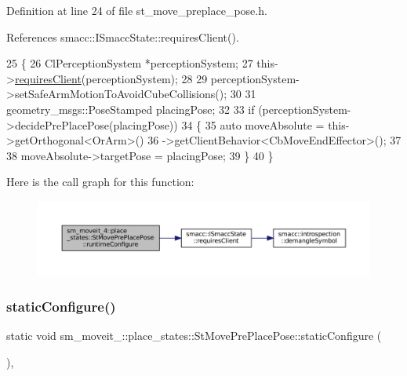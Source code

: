 Definition at line 24 of file st\+\_\+move\+\_\+preplace\+\_\+pose.\+h.



References smacc\+::\+I\+Smacc\+State\+::requires\+Client().


\begin{DoxyCode}
25             \{
26                 ClPerceptionSystem *perceptionSystem;
27                 this->\hyperlink{classsmacc_1_1ISmaccState_a7f95c9f0a6ea2d6f18d1aec0519de4ac}{requiresClient}(perceptionSystem);
28 
29                 perceptionSystem->setSafeArmMotionToAvoidCubeCollisions();
30 
31                 geometry\_msgs::PoseStamped placingPose;
32 
33                 \textcolor{keywordflow}{if} (perceptionSystem->decidePrePlacePose(placingPose))
34                 \{
35                     \textcolor{keyword}{auto} moveAbsolute = this->getOrthogonal<OrArm>()
36                                             ->getClientBehavior<CbMoveEndEffector>();
37 
38                     moveAbsolute->targetPose = placingPose;
39                 \}
40             \}
\end{DoxyCode}
Here is the call graph for this function\+:
\nopagebreak
\begin{figure}[H]
\begin{center}
\leavevmode
\includegraphics[width=350pt]{structsm__moveit__4_1_1place__states_1_1StMovePrePlacePose_a76aecb88d891dab05216eff868ee4ac7_cgraph}
\end{center}
\end{figure}
\mbox{\label{structsm__moveit__4_1_1place__states_1_1StMovePrePlacePose_afea638295fb6086b4d31c6b64302f2c2}} 
\subsubsection{\texorpdfstring{static\+Configure()}{staticConfigure()}}
{\footnotesize\ttfamily static void sm\+\_\+moveit\+\_\+::place\+\_\+states\+::\+St\+Move\+Pre\+Place\+Pose\+::static\+Configure (\begin{DoxyParamCaption}{ }\end{DoxyParamCaption})\hspace{0.3cm}{\ttfamily [inline]}, {\ttfamily [static]}}



